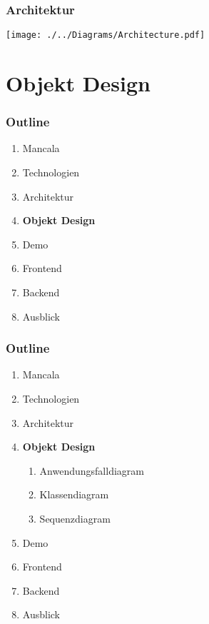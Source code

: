 \documentclass[
	10pt,
	t		%
]{beamer}
\begin{document}
\begin{frame}
\frametitle{Architektur}
\begin{center}
\texttt{[image: ./../Diagrams/Architecture.pdf]}
\end{center}
\end{frame}

\section{Objekt Design}
\begin{frame}
\frametitle{Outline}
\begin{enumerate}
\item Mancala
\item Technologien
\item Architektur
\item \textbf{Objekt Design}
\item Demo
\item Frontend
\item Backend
\item Ausblick
\end{enumerate}
\end{frame}

\begin{frame}
\frametitle{Outline}
\begin{enumerate}
\item Mancala
\item Technologien
\item Architektur
\item \textbf{Objekt Design}
\begin{enumerate}
\item Anwendungsfalldiagram
\item Klassendiagram
\item Sequenzdiagram
\end{enumerate}
\item Demo
\item Frontend
\item Backend
\item Ausblick
\end{enumerate}
\end{frame}
\end{document}
